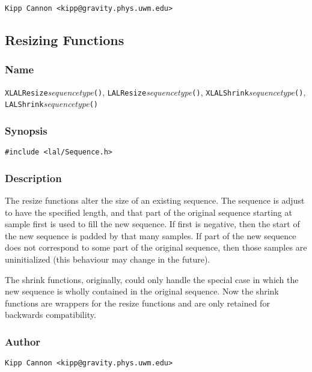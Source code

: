 \verb|Kipp Cannon <kipp@gravity.phys.uwm.edu>|


\subsection{Resizing Functions}

\subsubsection{Name}

\texttt{XLALResize}\textit{sequencetype}\texttt{()},
\texttt{LALResize}\textit{sequencetype}\texttt{()},
\texttt{XLALShrink}\textit{sequencetype}\texttt{()},
\texttt{LALShrink}\textit{sequencetype}\texttt{()}

\subsubsection{Synopsis}

\begin{verbatim}
#include <lal/Sequence.h>
\end{verbatim}


\subsubsection{Description}

The resize functions alter the size of an existing sequence.  The sequence
is adjust to have the specified length, and that part of the original
sequence starting at sample first is used to fill the new sequence.  If
first is negative, then the start of the new sequence is padded by that
many samples.  If part of the new sequence does not correspond to some part
of the original sequence, then those samples are uninitialized (this
behaviour may change in the future).

The shrink functions, originally, could only handle the special case in
which the new sequence is wholly contained in the original sequence.  Now
the shrink functions are wrappers for the resize functions and are only
retained for backwards compatibility.

\subsubsection{Author}

\verb|Kipp Cannon <kipp@gravity.phys.uwm.edu>|
